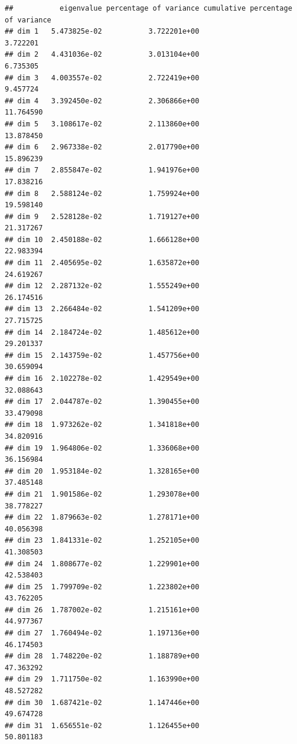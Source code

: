 \documentclass[
]{book}
\begin{document}
\begin{verbatim}
##           eigenvalue percentage of variance cumulative percentage of variance
## dim 1   5.473825e-02           3.722201e+00                          3.722201
## dim 2   4.431036e-02           3.013104e+00                          6.735305
## dim 3   4.003557e-02           2.722419e+00                          9.457724
## dim 4   3.392450e-02           2.306866e+00                         11.764590
## dim 5   3.108617e-02           2.113860e+00                         13.878450
## dim 6   2.967338e-02           2.017790e+00                         15.896239
## dim 7   2.855847e-02           1.941976e+00                         17.838216
## dim 8   2.588124e-02           1.759924e+00                         19.598140
## dim 9   2.528128e-02           1.719127e+00                         21.317267
## dim 10  2.450188e-02           1.666128e+00                         22.983394
## dim 11  2.405695e-02           1.635872e+00                         24.619267
## dim 12  2.287132e-02           1.555249e+00                         26.174516
## dim 13  2.266484e-02           1.541209e+00                         27.715725
## dim 14  2.184724e-02           1.485612e+00                         29.201337
## dim 15  2.143759e-02           1.457756e+00                         30.659094
## dim 16  2.102278e-02           1.429549e+00                         32.088643
## dim 17  2.044787e-02           1.390455e+00                         33.479098
## dim 18  1.973262e-02           1.341818e+00                         34.820916
## dim 19  1.964806e-02           1.336068e+00                         36.156984
## dim 20  1.953184e-02           1.328165e+00                         37.485148
## dim 21  1.901586e-02           1.293078e+00                         38.778227
## dim 22  1.879663e-02           1.278171e+00                         40.056398
## dim 23  1.841331e-02           1.252105e+00                         41.308503
## dim 24  1.808677e-02           1.229901e+00                         42.538403
## dim 25  1.799709e-02           1.223802e+00                         43.762205
## dim 26  1.787002e-02           1.215161e+00                         44.977367
## dim 27  1.760494e-02           1.197136e+00                         46.174503
## dim 28  1.748220e-02           1.188789e+00                         47.363292
## dim 29  1.711750e-02           1.163990e+00                         48.527282
## dim 30  1.687421e-02           1.147446e+00                         49.674728
## dim 31  1.656551e-02           1.126455e+00                         50.801183

\end{verbatim}
\end{document}

